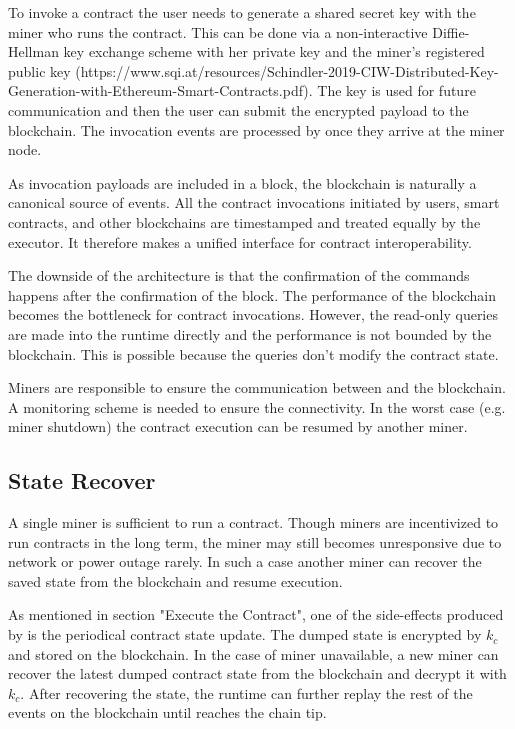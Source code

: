 To invoke a contract the user needs to generate a shared secret key with the miner who runs the contract. This can be done via a non-interactive Diffie-Hellman key exchange scheme with her private key and the miner's registered public key (https://www.sqi.at/resources/Schindler-2019-CIW-Distributed-Key-Generation-with-Ethereum-Smart-Contracts.pdf). The key is used for future communication and then the user can submit the encrypted payload to the blockchain. The invocation events are processed by \pruntime once they arrive at the miner node.

As invocation payloads are included in a block, the blockchain is naturally a canonical source of events. All the contract invocations initiated by users, smart contracts, and other blockchains are timestamped and treated equally by the executor. It therefore makes a unified interface for contract interoperability.

The downside of the architecture is that the confirmation of the commands happens after the confirmation of the block. The performance of the blockchain becomes the bottleneck for contract invocations. However, the read-only queries are made into the runtime directly and the performance is not bounded by the blockchain. This is possible because the queries don't modify the contract state.

Miners are responsible to ensure the communication between \pruntime and the blockchain. A monitoring scheme is needed to ensure the connectivity. In the worst case (e.g.\,miner shutdown) the contract execution can be resumed by another miner.

\subsection{State Recover}

A single miner is sufficient to run a contract. Though miners are incentivized to run contracts in the long term, the miner may still becomes unresponsive due to network or power outage rarely. In such a case another miner can recover the saved state from the blockchain and resume execution.

As mentioned in section "Execute the Contract", one of the side-effects produced by \pruntime  is the periodical contract state update. The dumped state is encrypted by $k_c$ and stored on the blockchain. In the case of miner unavailable, a new miner can recover the latest dumped contract state from the blockchain and decrypt it with $k_c$. After recovering the state, the runtime can further replay the rest of the events on the blockchain until reaches the chain tip.

